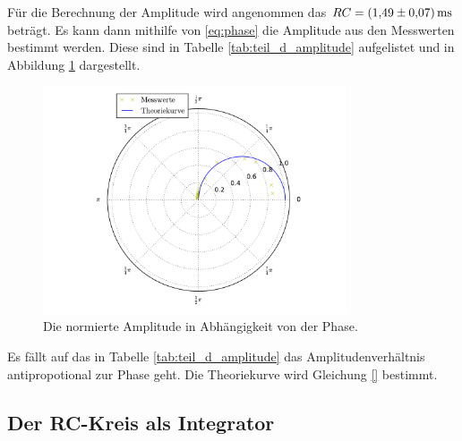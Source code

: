 Für die Berechnung der Amplitude wird angenommen das $RC=\SI{1.49\pm0.07}{\milli\second}$ %
beträgt. Es kann dann mithilfe von \eqref{eq:phase} die Amplitude aus den Messwerten bestimmt werden. %
Diese sind in Tabelle \ref{tab:teil_d_amplitude} aufgelistet und in Abbildung \ref{fig:plot_teil_d} dargestellt.
\FloatBarrier

\FloatBarrier
\FloatBarrier
\begin{figure}
  \centering
  \includegraphics[width=0.8\textwidth]{pics/polarplot.pdf}
  \caption{Die normierte Amplitude in Abhängigkeit von der Phase.}
  \label{fig:plot_teil_d}
\end{figure}
\FloatBarrier
Es fällt auf das in Tabelle \ref{tab:teil_d_amplitude} das Amplitudenverhältnis %
antipropotional zur Phase geht. %
Die Theoriekurve wird Gleichung \eqref{} bestimmt. %

\subsection{Der RC-Kreis als Integrator}

